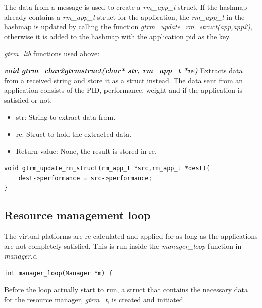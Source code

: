 \documentclass[nobiblatex]{LTHthesis}
\begin{document}
The data from a message is used to create a \emph{rm\_app\_t} struct. If the hashmap already contains a \emph{rm\_app\_t} struct for the application, the \emph{rm\_app\_t} in the hashmap is updated by calling the function 
\emph{gtrm\_update\_rm\_struct(app,app2)}, otherwise it is added to the hashmap with the application pid as the key.

\emph{gtrm\_lib} functions used above:


\begin{framed}
		\begin{flushleft}
			\textbf{\emph{void gtrm\_char2gtrmstruct(char* str, rm\_app\_t *re)}}
			Extracts data from a received string and store it as a struct instead. The data sent from an application consists of the PID, performance, weight and if the application is satisfied or not.
			\begin{itemize} 
			\item str: String to extract data from.
			\item re: Struct to hold the extracted data.
			\item Return value: None, the result is stored in re.
			\end{itemize}
		\end{flushleft}	
\end{framed}



\begin{verbatim}
void gtrm_update_rm_struct(rm_app_t *src,rm_app_t *dest){
	dest->performance = src->performance;			
}
\end{verbatim}



\subsection{Resource management loop}
The virtual platforms are re-calculated and applied for as long as the applications are not completely satisfied. This is run inside the \emph{manager\_loop}-function in \emph{manager.c}.

\begin{verbatim}
int manager_loop(Manager *m) {
\end{verbatim}
Before the loop actually start to run, a struct that contains the necessary data for the resource manager, \emph{gtrm\_t}, is created and initiated.
\end{document}
